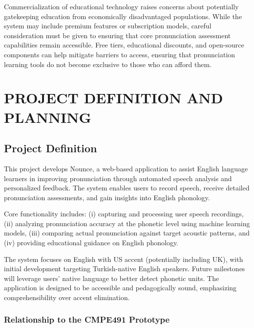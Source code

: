 \documentclass[a4paper,12pt]{report}
\begin{document}
Commercialization of educational technology raises concerns about potentially gatekeeping education from economically disadvantaged populations. While the system may include premium features or subscription models, careful consideration must be given to ensuring that core pronunciation assessment capabilities remain accessible. Free tiers, educational discounts, and open-source components can help mitigate barriers to access, ensuring that pronunciation learning tools do not become exclusive to those who can afford them.

\chapter{PROJECT DEFINITION AND PLANNING}
\section{Project Definition}
This project develops Nounce, a web-based application to assist English language learners in improving pronunciation through automated speech analysis and personalized feedback. The system enables users to record speech, receive detailed pronunciation assessments, and gain insights into English phonology.

Core functionality includes: (i) capturing and processing user speech recordings, (ii) analyzing pronunciation accuracy at the phonetic level using machine learning models, (iii) comparing actual pronunciation against target acoustic patterns, and (iv) providing educational guidance on English phonology.

The system focuses on English with US accent (potentially including UK), with initial development targeting Turkish-native English speakers. Future milestones will leverage users' native language to better detect phonetic units. The application is designed to be accessible and pedagogically sound, emphasizing comprehensibility over accent elimination.

\subsection{Relationship to the CMPE491 Prototype}
\label{sec:v1-vs-v2}
\end{document}
